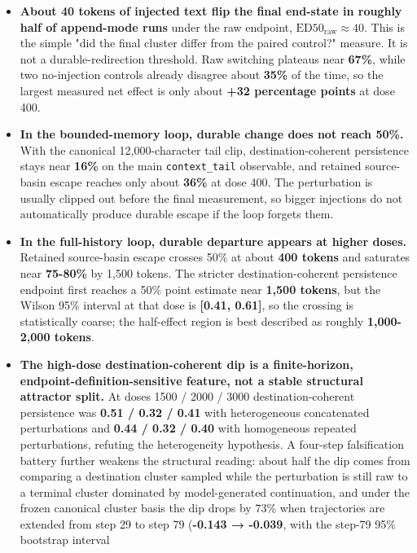 \documentclass{article}
\theoremstyle{plain}
\theoremstyle{definition}
\begin{document}
\begin{itemize}
  \item \textbf{About 40 tokens of injected text flip the final end-state in
  roughly half of append-mode runs} under the raw endpoint,
  $\mathrm{ED50}_{\mathrm{raw}} \approx 40$. This is the simple "did
  the final cluster differ from the paired control?" measure. It
  is not a durable-redirection threshold. Raw switching plateaus
  near \textbf{67\%}, while two no-injection controls already disagree
  about \textbf{35\%} of the time, so the largest measured net effect is
  only about \textbf{+32 percentage points} at dose 400.
  \item \textbf{In the bounded-memory loop, durable change does not reach
  50\%.} With the canonical 12,000-character tail clip,
  destination-coherent persistence stays near \textbf{16\%} on the main
  \texttt{context\_tail} observable, and retained source-basin escape
  reaches only about \textbf{36\%} at dose 400. The perturbation is
  usually clipped out before the final measurement, so bigger
  injections do not automatically produce durable escape if the
  loop forgets them.
  \item \textbf{In the full-history loop, durable departure appears at higher
  doses.} Retained source-basin escape crosses 50\% at about \textbf{400
  tokens} and saturates near \textbf{75-80\%} by 1,500 tokens. The
  stricter destination-coherent persistence endpoint first reaches
  a 50\% point estimate near \textbf{1,500 tokens}, but the Wilson 95\%
  interval at that dose is \textbf{[0.41, 0.61]}, so the crossing is
  statistically coarse; the half-effect region is best described
  as roughly \textbf{1,000-2,000 tokens}.
  \item \textbf{The high-dose destination-coherent dip is a finite-horizon,
  endpoint-definition-sensitive feature, not a stable structural
  attractor split.} At doses 1500 / 2000 / 3000 destination-coherent
  persistence was \textbf{0.51 / 0.32 / 0.41} with heterogeneous
  concatenated perturbations and \textbf{0.44 / 0.32 / 0.40} with
  homogeneous repeated perturbations, refuting the heterogeneity
  hypothesis. A four-step falsification battery further weakens the
  structural reading: about half the dip comes from comparing a
  destination cluster sampled while the perturbation is still raw
  to a terminal cluster dominated by model-generated continuation,
  and under the frozen canonical cluster basis the dip drops by
  73\% when trajectories are extended from step 29 to step 79
  (\textbf{-0.143 → -0.039}, with the step-79 95\% bootstrap interval

\end{itemize}
\end{document}
